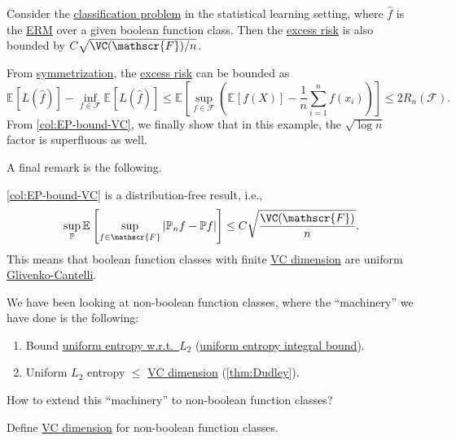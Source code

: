 \begin{note}
	Consider the \hyperref[eg:1D-classification-thresholds]{classification problem} in the statistical learning setting, where \(\hat{f} \) is the \hyperref[prb:ERM]{ERM} over a given boolean function class. Then the \hyperref[def:excess-risk]{excess risk} is also bounded by \(C \sqrt{\VC(\mathscr{F} ) / n} \).
\end{note}
\begin{explanation}
	From \hyperref[lma:symmetrization]{symmetrization}, the \hyperref[def:excess-risk]{excess risk} can be bounded as
	\[
		\mathbb{E}_{}\left[L(\hat{f} ) \right] - \inf _{f\in \mathscr{F} } \mathbb{E}_{}\left[L(\hat{f} ) \right]
		\leq \mathbb{E}_{}\left[\sup _{f\in \mathscr{F} } \left( \mathbb{E}_{}\left[f(X) \right] - \frac{1}{n}\sum_{i=1}^{n} f(x_i) \right) \right]
		\leq 2R_n(\mathscr{F} ).
	\]
	From \autoref{col:EP-bound-VC}, we finally show that in this example, the \(\sqrt{\log n} \) factor is superfluous as well.
\end{explanation}

A final remark is the following.

\begin{remark}
	\autoref{col:EP-bound-VC} is a distribution-free result, i.e.,
	\[
		\sup _{\mathbb{P} } \mathbb{E}_{}\left[\sup _{f\in \mathscr{F}} \vert \mathbb{P} _n f - \mathbb{P} f \vert  \right] \leq C \sqrt{\frac{\VC(\mathscr{F} )}{n}} .
	\]
	This means that boolean function classes with finite \hyperref[def:VC-dimension]{VC dimension} are uniform \hyperref[def:Glivenko-Cantelli]{Glivenko-Cantelli}.
\end{remark}

We have been looking at non-boolean function classes, where the ``machinery'' we have done is the following:
\begin{enumerate}
	\item Bound \hyperref[def:Koltchinskii-Pollard-entropy]{uniform entropy w.r.t.\ \(L_2\)} (\hyperref[thm:uniform-entropy-integral-bound]{uniform entropy integral bound}).
	\item Uniform \(L_2\) entropy \(\leq \) \hyperref[def:VC-dimension]{VC dimension} (\autoref{thm:Dudley}).
\end{enumerate}

\begin{problem*}
	How to extend this ``machinery'' to non-boolean function classes?
\end{problem*}
\begin{answer}
	Define \hyperref[def:VC-dimension]{VC dimension} for non-boolean function classes.
\end{answer}